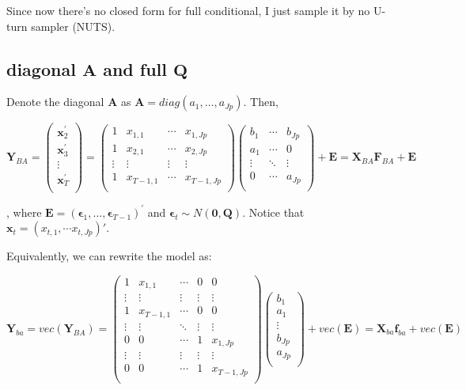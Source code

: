 \documentclass[]{article}
\begin{document}
Since now there's no closed form for full conditional, I just sample it by no U-turn sampler (NUTS).

\subsection{diagonal $\mathbf{A}$ and full $\mathbf{Q}$}
Denote the diagonal \(\mathbf{A}\) as \(\mathbf{A} = diag(a_{1},\ldots,a_{Jp})\). Then,

\[\mathbf{Y}_{BA} = \begin{pmatrix}
	\mathbf{x}_{2}^{'} \\
	\mathbf{x}_{3}^{'} \\
	\vdots \\
	\mathbf{x}_{T}^{'} \\
\end{pmatrix} = \begin{pmatrix}
	1 & x_{1,1} & \cdots & x_{1,Jp} \\
	1 & x_{2,1} & \cdots & x_{2,Jp} \\
	\vdots & \vdots & \vdots & \vdots \\
	1 & x_{T - 1,1} & \cdots & x_{T - 1,Jp} \\
\end{pmatrix}\begin{pmatrix}
	b_{1} & \cdots & b_{Jp} \\
	a_{1} & \cdots & 0 \\
	\vdots & \ddots & \vdots \\
	0 & \cdots & a_{Jp} \\
\end{pmatrix} + \mathbf{E} = \mathbf{X}_{BA}\mathbf{F}_{BA} + \mathbf{E}\]

, where
\(\mathbf{E} = \left( \bm{\epsilon}_{1},\ldots,\bm{\epsilon}_{T - 1} \right)^{'}\)
and \(\bm{\epsilon}_{t} \sim N(\mathbf{0},\mathbf{Q})\). Notice that
\(\mathbf{x}_{t} = (x_{t, 1}, \cdots x_{t, Jp})'\).

Equivalently, we can rewrite the model as:

\[\mathbf{Y}_{ba} = vec\left(\mathbf{Y}_{BA} \right) = \begin{pmatrix}
	1 & x_{1,1} & \cdots & 0 & 0 \\
	\vdots & \vdots & \vdots & \vdots & \vdots \\
	1 & x_{T - 1,1} & \cdots & 0 & 0 \\
	\vdots & \vdots & \ddots & \vdots & \vdots \\
	0 & 0 & \cdots & 1 & x_{1,Jp} \\
	\vdots & \vdots & \vdots & \vdots & \vdots \\
	0 & 0 & \cdots & 1 & x_{T - 1,Jp} \\
\end{pmatrix}\begin{pmatrix}
	b_{1} \\
	a_{1} \\
	\vdots \\
	b_{Jp} \\
	a_{Jp} \\
\end{pmatrix} + vec(\mathbf{E}) = \mathbf{X}_{ba}\mathbf{f}_{ba} + vec(\mathbf{E})\]
\end{document}
